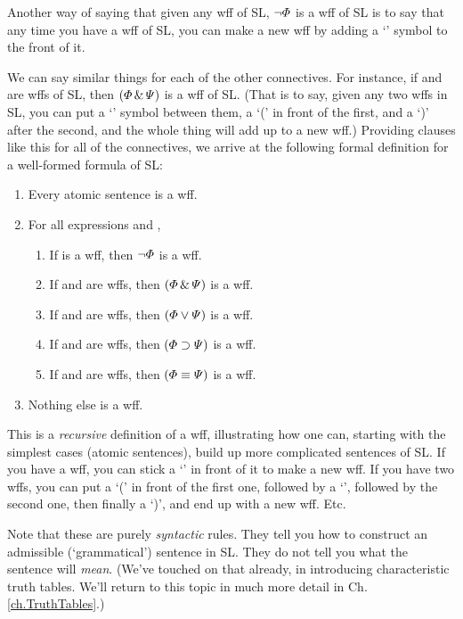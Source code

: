 Another way of saying that given any wff \metaA{} of SL, $\neg\varPhi{}$ is a wff of SL is to say that any time you have a wff of SL, you can make a new wff by adding a `\enot' symbol to the front of it.

We can say similar things for each of the other connectives. For instance, if \metaA{} and \metaB{} are wffs of SL, then $(\varPhi{}\,\&\,\varPsi{})$ is a wff of SL. (That is to say, given any two wffs in SL, you can put a `\eand' symbol between them, a `(' in front of the first, and a `)' after the second, and the whole thing will add up to a new wff.)  Providing clauses like this for all of the connectives, we arrive at the following formal definition for a {well-formed formula of SL}:

\begin{enumerate}
\item Every atomic sentence is a wff.
\item For all expressions \metaA{} and \metaB{},
	\begin{enumerate}
		\item If \metaA{} is a wff, then $\neg\varPhi{}$ is a wff.
		\item If \metaA{} and \metaB{} are wffs, then $(\varPhi{}\,\&\,\varPsi{})$ is a wff.
		\item If \metaA{} and \metaB{} are wffs, then $(\varPhi{}\vee\varPsi{})$ is a wff.
		\item If \metaA{} and \metaB{} are wffs, then $(\varPhi{}\supset\varPsi{})$ is a wff.
		\item If \metaA{} and \metaB{} are wffs, then $(\varPhi{}\equiv\varPsi{})$ is a wff.
	\end{enumerate}
\item Nothing else is a wff.
\end{enumerate}

This is a \emph{recursive} definition of a wff, illustrating how one can, starting with the simplest cases (atomic sentences), build up more complicated sentences of SL. If you have a wff, you can stick a `\enot' in front of it to make a new wff. If you have two wffs, you can put a `(' in front of the first one, followed by a `\eand', followed by the second one, then finally a `)', and end up with a new wff. Etc.

Note that these are purely \emph{syntactic} rules. They tell you how to construct an admissible (`grammatical') sentence in SL. They do not tell you what the sentence will \emph{mean}. (We've touched on that already, in introducing characteristic truth tables. We'll return to this topic in much more detail in Ch. \ref{ch.TruthTables}.)

